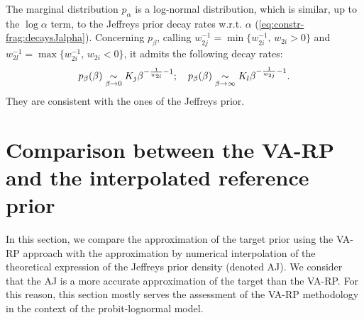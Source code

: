 The marginal distribution $p_\alpha$ is a log-normal distribution, which is similar, up to the $\log \alpha$ term, to the Jeffreys prior decay rates w.r.t. $\alpha$ (\cref{eq:constr-frag:decaysJalpha}).  Concerning $p_\beta$, calling $w_{2j}^{-1}=\min\{w_{2i}^{-1},\,w_{2i}>0\}$ and $w_{2l}^{-1}=\max\{w_{2i}^{-1},\,w_{2i}<0\}$, 
it admits the following decay rates:
\begin{equation}
    p_\beta(\beta)\underset{\beta\rightarrow0}{\sim} K_j\beta^{-\frac{1}{w_{2l}}-1};\quad p_\beta(\beta)\underset{\beta\rightarrow\infty}{\sim} K_l\beta^{-\frac{1}{w_{2j}}-1}.
    \label{eq:palphabeta}
\end{equation}
They are consistent with the ones of the Jeffreys prior. %























\section{Comparison between the VA-RP and the interpolated reference prior}\label{sec:constr-frags:coparisonpriors}



In this section, we compare the approximation of the target prior using the VA-RP approach with the approximation by numerical interpolation of the theoretical expression of the Jeffreys prior density (denoted AJ).
We consider that the AJ is a more accurate approximation of the target than the VA-RP. For this reason, this section mostly serves the assessment of the VA-RP methodology in the context of the probit-lognormal model.

